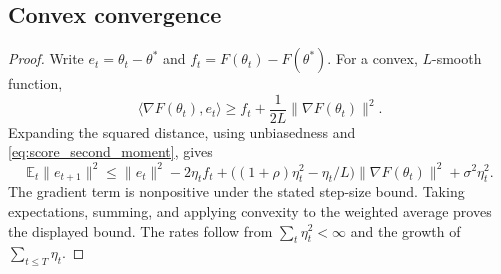 \subsection{Convex convergence}
\begin{proof}
Write $e_t=\theta_t-\theta^*$ and $f_t=F(\theta_t)-F(\theta^*)$.
For a convex, $L$-smooth function,
\[
\langle\nabla F(\theta_t),e_t\rangle
\ge f_t+\frac1{2L}\|\nabla F(\theta_t)\|^2.
\]
Expanding the squared distance, using unbiasedness and
\eqref{eq:score_second_moment}, gives
\[
\mathbb E_t\|e_{t+1}\|^2
\le\|e_t\|^2-2\eta_tf_t
+\bigl((1+\rho)\eta_t^2-\eta_t/L\bigr)
\|\nabla F(\theta_t)\|^2+\sigma^2\eta_t^2.
\]
The gradient term is nonpositive under the stated step-size bound.
Taking expectations, summing, and applying convexity to the weighted
average proves the displayed bound. The rates follow from
$\sum_t\eta_t^2<\infty$ and the growth of $\sum_{t\le T}\eta_t$.
\end{proof}

